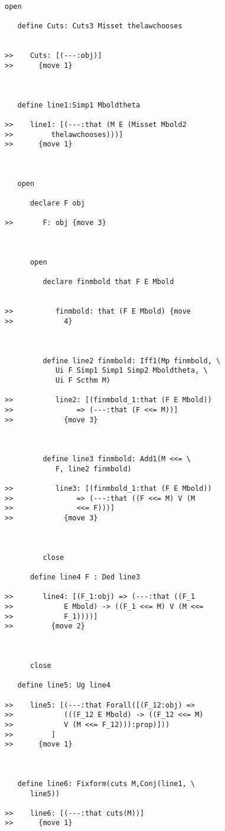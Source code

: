 \documentclass[12pt]{article}
\begin{document}
\begin{verbatim}
open

   define Cuts: Cuts3 Misset thelawchooses


>>    Cuts: [(---:obj)]
>>      {move 1}



   define line1:Simp1 Mboldtheta

>>    line1: [(---:that (M E (Misset Mbold2
>>         thelawchooses)))]
>>      {move 1}



   open

      declare F obj

>>       F: obj {move 3}



      open

         declare finmbold that F E Mbold


>>          finmbold: that (F E Mbold) {move
>>            4}



         define line2 finmbold: Iff1(Mp finmbold, \
            Ui F Simp1 Simp1 Simp2 Mboldtheta, \
            Ui F Scthm M)

>>          line2: [(finmbold_1:that (F E Mbold))
>>               => (---:that (F <<= M))]
>>            {move 3}



         define line3 finmbold: Add1(M <<= \
            F, line2 finmbold)

>>          line3: [(finmbold_1:that (F E Mbold))
>>               => (---:that ((F <<= M) V (M
>>               <<= F)))]
>>            {move 3}



         close

      define line4 F : Ded line3

>>       line4: [(F_1:obj) => (---:that ((F_1
>>            E Mbold) -> ((F_1 <<= M) V (M <<=
>>            F_1))))]
>>         {move 2}



      close

   define line5: Ug line4

>>    line5: [(---:that Forall([(F_12:obj) =>
>>            (((F_12 E Mbold) -> ((F_12 <<= M)
>>            V (M <<= F_12))):prop)]))
>>         ]
>>      {move 1}



   define line6: Fixform(cuts M,Conj(line1, \
      line5))

>>    line6: [(---:that cuts(M))]
>>      {move 1}




\end{verbatim}
\end{document}
